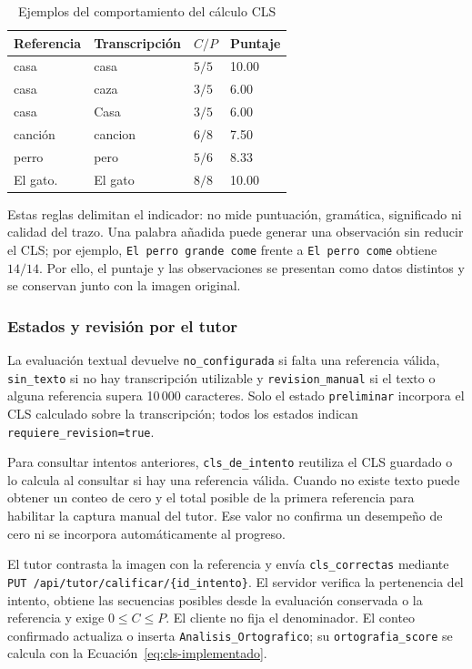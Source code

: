 \begin{table}[H]
\centering
\caption{Ejemplos del comportamiento del cálculo CLS}
\label{tab:ejemplos-cls-diseno}
\begin{tabular}{llll}
\toprule
Referencia & Transcripción & $C/P$ & Puntaje \\
\midrule
casa & casa & $5/5$ & 10.00 \\
casa & caza & $3/5$ & 6.00 \\
casa & Casa & $3/5$ & 6.00 \\
canción & cancion & $6/8$ & 7.50 \\
perro & pero & $5/6$ & 8.33 \\
El gato. & El gato & $8/8$ & 10.00 \\
\bottomrule
\end{tabular}
\end{table}

Estas reglas delimitan el indicador: no mide puntuación, gramática, significado ni calidad del trazo. Una palabra añadida puede generar una observación sin reducir el CLS; por ejemplo, \texttt{El perro grande come} frente a \texttt{El perro come} obtiene $14/14$. Por ello, el puntaje y las observaciones se presentan como datos distintos y se conservan junto con la imagen original.

\subsubsection{Estados y revisión por el tutor}
La evaluación textual devuelve \texttt{no\_configurada} si falta una referencia válida, \texttt{sin\_texto} si no hay transcripción utilizable y \texttt{revision\_manual} si el texto o alguna referencia supera 10\,000 caracteres. Solo el estado \texttt{preliminar} incorpora el CLS calculado sobre la transcripción; todos los estados indican \texttt{requiere\_revision=true}.

Para consultar intentos anteriores, \texttt{cls\_de\_intento} reutiliza el CLS guardado o lo calcula al consultar si hay una referencia válida. Cuando no existe texto puede obtener un conteo de cero y el total posible de la primera referencia para habilitar la captura manual del tutor. Ese valor no confirma un desempeño de cero ni se incorpora automáticamente al progreso.

El tutor contrasta la imagen con la referencia y envía \texttt{cls\_correctas} mediante \texttt{PUT /api/tutor/calificar/\{id\_intento\}}. El servidor verifica la pertenencia del intento, obtiene las secuencias posibles desde la evaluación conservada o la referencia y exige $0\leq C\leq P$. El cliente no fija el denominador. El conteo confirmado actualiza o inserta \texttt{Analisis\_Ortografico}; su \texttt{ortografia\_score} se calcula con la Ecuación~\ref{eq:cls-implementado}.

